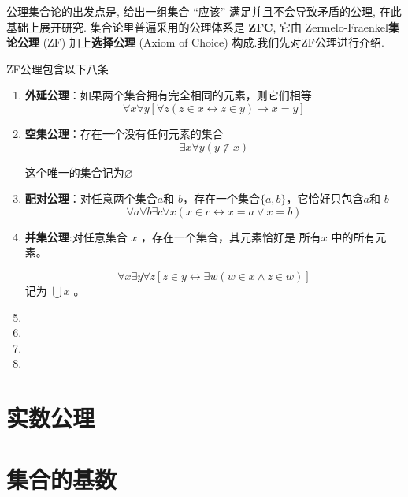 公理集合论的出发点是, 给出一组集合 “应该” 满足并且不会导致矛盾的公理,
在此基础上展开研究. 集合论里普遍采用的公理体系是 \textbf{ZFC}, 它由 Zermelo-Fraenkel\textbf{集论公理 }(ZF) 加上\textbf{选择公理} (Axiom of Choice) 构成.我们先对ZF公理进行介绍.
\begin{axiom}ZF公理包含以下八条
	\begin{enumerate}
		\item \textbf{外延公理}：如果两个集合拥有完全相同的元素，则它们相等$$
		\forall x \forall y[\forall z(z \in x \leftrightarrow z \in y) \rightarrow x=y]
		$$
		\item \textbf{空集公理}：存在一个没有任何元素的集合$$\exists x\forall y(y\notin x)$$
		
		这个唯一的集合记为$\varnothing$
		\item \textbf{配对公理}：对任意两个集合$a$和 $b$，存在一个集合$\{a,b\}$，它恰好只包含$a$和 $b$
		$$\forall a\forall b\exists c\forall x(x\in c\leftrightarrow x=a\vee x=b)$$
		\item \textbf{并集公理}:对任意集合 $x$ ，存在一个集合，其元素恰好是 所有$x$ 中的所有元素。
		
		$$
		\forall x \exists y \forall z[z \in y \leftrightarrow \exists w(w \in x \wedge z \in w)]
		$$记为 $\bigcup x$ 。
		\item 
		\item 
		\item 
		\item  
	\end{enumerate}
\end{axiom}






































\section{实数公理}
\section{集合的基数}
